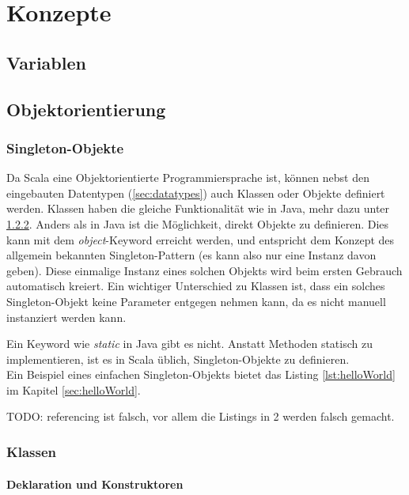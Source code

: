 \chapter{Konzepte}

\section{Variablen}



\section{Objektorientierung}

\subsection{Singleton-Objekte}

Da Scala eine Objektorientierte Programmiersprache ist, können nebst
den eingebauten Datentypen (\ref{sec:datatypes}) auch Klassen oder
Objekte definiert werden. Klassen haben die gleiche Funktionalität
wie in Java, mehr dazu unter \ref{sec:classes}.  Anders als in Java
ist die Möglichkeit, direkt Objekte zu definieren.  Dies kann mit dem
\emph{object}-Keyword erreicht werden, und entspricht dem Konzept des
allgemein bekannten Singleton-Pattern (es kann also nur eine Instanz davon
geben). Diese einmalige Instanz eines solchen Objekts wird beim ersten
Gebrauch automatisch kreiert. Ein wichtiger Unterschied zu Klassen ist,
dass ein solches Singleton-Objekt keine Parameter entgegen nehmen kann,
da es nicht manuell instanziert werden kann.

Ein Keyword wie \emph{static} in Java gibt es nicht. Anstatt Methoden
statisch zu implementieren, ist es in Scala üblich, Singleton-Objekte
zu definieren.\\

Ein Beispiel eines einfachen Singleton-Objekts bietet das Listing
\ref{lst:helloWorld} im Kapitel \ref{sec:helloWorld}.

TODO: referencing ist falsch, vor allem die Listings in 2 werden falsch gemacht.

\subsection{Klassen}
\label{sec:classes}

\subsubsection{Deklaration und Konstruktoren}


